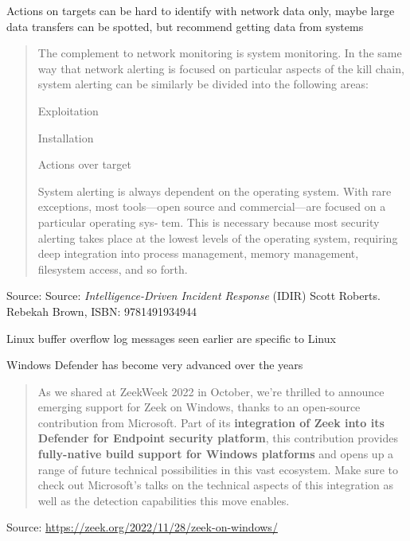 \documentclass[Screen16to9,17pt]{foils}
\begin{document}
Actions on targets can be hard to identify with network data only,
maybe large data transfers can be spotted, but recommend getting data from systems



\begin{quote}\small
The complement to network monitoring is system monitoring. In the same way that
network alerting is focused on particular aspects of the kill chain, system alerting can
be similarly be divided into the following areas:
\begin{list2}
\item Exploitation
\item Installation
\item Actions over target
\end{list2}
System alerting is always dependent on the operating system. With rare exceptions,
most tools—open source and commercial—are focused on a particular operating sys‐
tem. This is necessary because most security alerting takes place at the lowest levels of
the operating system, requiring deep integration into process management, memory
management, filesystem access, and so forth.
\end{quote}
Source: Source: \emph{Intelligence-Driven Incident Response} (IDIR)
 Scott Roberts. Rebekah Brown, ISBN: 9781491934944

\begin{list2}
\item Linux buffer overflow log messages seen earlier are specific to Linux
\item Windows Defender has become very advanced over the years
\end{list2}




\begin{quote}
As we shared at ZeekWeek 2022 in October, we’re thrilled to announce emerging support for Zeek on Windows, thanks to an open-source contribution from Microsoft. Part of its {\bf integration of Zeek into its Defender for Endpoint security platform}, this contribution provides {\bf fully-native build support for Windows platforms} and opens up a range of future technical possibilities in this vast ecosystem. Make sure to check out Microsoft’s talks on the technical aspects of this integration as well as the detection capabilities this move enables.
\end{quote}
Source: \url{https://zeek.org/2022/11/28/zeek-on-windows/}
\end{document}
